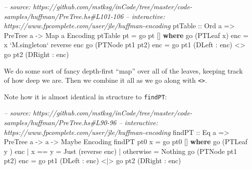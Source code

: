 \documentclass[]{article}
\newenvironment{Shaded}{}{}
\newcommand{\KeywordTok}[1]{\textcolor[rgb]{0.00,0.44,0.13}{\textbf{{#1}}}}
\newcommand{\DataTypeTok}[1]{\textcolor[rgb]{0.56,0.13,0.00}{{#1}}}
\newcommand{\CommentTok}[1]{\textcolor[rgb]{0.38,0.63,0.69}{\textit{{#1}}}}
\newcommand{\OtherTok}[1]{\textcolor[rgb]{0.00,0.44,0.13}{{#1}}}
\newcommand{\FunctionTok}[1]{\textcolor[rgb]{0.02,0.16,0.49}{{#1}}}
\newcommand{\NormalTok}[1]{{#1}}
\begin{document}
\begin{Shaded}
\begin{Highlighting}[]
\CommentTok{-- source: https://github.com/mstksg/inCode/tree/master/code-samples/huffman/PreTree.hs#L101-106}
\CommentTok{-- interactive: https://www.fpcomplete.com/user/jle/huffman-encoding}
\OtherTok{ptTable ::} \DataTypeTok{Ord} \NormalTok{a }\OtherTok{=>} \DataTypeTok{PreTree} \NormalTok{a }\OtherTok{->} \DataTypeTok{Map} \NormalTok{a }\DataTypeTok{Encoding}
\NormalTok{ptTable pt }\FunctionTok{=} \NormalTok{go pt []}
  \KeywordTok{where}
    \NormalTok{go (}\DataTypeTok{PTLeaf} \NormalTok{x) enc       }\FunctionTok{=} \NormalTok{x }\OtherTok{`M.singleton`} \NormalTok{reverse enc}
    \NormalTok{go (}\DataTypeTok{PTNode} \NormalTok{pt1 pt2) enc }\FunctionTok{=} \NormalTok{go pt1 (}\DataTypeTok{DLeft}  \FunctionTok{:} \NormalTok{enc) }\FunctionTok{<>}
                              \NormalTok{go pt2 (}\DataTypeTok{DRight} \FunctionTok{:} \NormalTok{enc)}
\end{Highlighting}
\end{Shaded}

We do some sort of fancy depth-first ``map'' over all of the leaves,
keeping track of how deep we are. Then we combine it all as we go along
with \texttt{\textless{}\textgreater{}}.

Note how it is almost identical in structure to \texttt{findPT}:

\begin{Shaded}
\begin{Highlighting}[]
\CommentTok{-- source: https://github.com/mstksg/inCode/tree/master/code-samples/huffman/PreTree.hs#L90-96}
\CommentTok{-- interactive: https://www.fpcomplete.com/user/jle/huffman-encoding}
\OtherTok{findPT ::} \DataTypeTok{Eq} \NormalTok{a }\OtherTok{=>} \DataTypeTok{PreTree} \NormalTok{a }\OtherTok{->} \NormalTok{a }\OtherTok{->} \DataTypeTok{Maybe} \DataTypeTok{Encoding}
\NormalTok{findPT pt0 x }\FunctionTok{=} \NormalTok{go pt0 []}
  \KeywordTok{where}
    \NormalTok{go (}\DataTypeTok{PTLeaf} \NormalTok{y      ) enc }\FunctionTok{|} \NormalTok{x }\FunctionTok{==} \NormalTok{y    }\FunctionTok{=} \DataTypeTok{Just} \NormalTok{(reverse enc)}
                            \FunctionTok{|} \NormalTok{otherwise }\FunctionTok{=} \DataTypeTok{Nothing}
    \NormalTok{go (}\DataTypeTok{PTNode} \NormalTok{pt1 pt2) enc }\FunctionTok{=} \NormalTok{go pt1 (}\DataTypeTok{DLeft}  \FunctionTok{:} \NormalTok{enc) }\FunctionTok{<|>}
                              \NormalTok{go pt2 (}\DataTypeTok{DRight} \FunctionTok{:} \NormalTok{enc)}
\end{Highlighting}
\end{Shaded}
\end{document}
